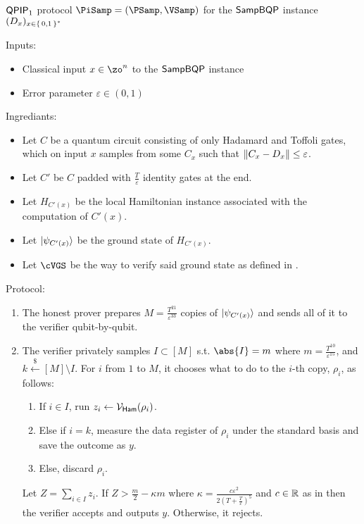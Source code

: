 \begin{protocol}{$\operatorname{\mathsf{QPIP}}_1$ protocol $\PiSamp=(\PSamp, \VSamp)$ for the $\operatorname{\mathsf{SampBQP}}$ instance $(D_x)_{x\in\set{0, 1}^*}$}
	\label{ProtoQPIP1}

	Inputs: 
	\begin{itemize}
		\item Classical input $x\in\zo^n$ to the $\operatorname{\mathsf{SampBQP}}$ instance
		\item Error parameter $\varepsilon\in(0, 1)$
	\end{itemize}

	Ingrediants:
	\begin{itemize}
		\item Let $C$ be a quantum circuit consisting of only Hadamard and Toffoli gates, which on input $x$ samples from some $C_x$ such that $\left\lVert C_x-D_x\right\rVert\leq\varepsilon$.
		\item Let $C'$ be $C$ padded with $\frac{T}{\varepsilon}$ identity gates at the end.
		\item Let $H_{C'(x)}$ be the local Hamiltonian instance associated with the computation of $C'(x)$.
		\item Let $\ket{\psi_{C'(x)}}$ be the ground state of $H_{C'(x)}$.
		\item Let $\cVGS$ be the way to verify said ground state as defined in . 
	\end{itemize}

	Protocol:
	\begin{enumerate}
		\item The honest prover prepares $M=\frac{T^{21}}{\varepsilon^{33}}$ copies of $\ket{\psi_{C'(x)}}$ and sends all of it to the verifier qubit-by-qubit.
		\item The verifier privately samples $I\subset[M]$ s.t. $\abs{I}=m$ where $m=\frac{T^{10}}{\varepsilon^{15}}$, and $k\xleftarrow{\$}[M]\setminus I$.
			For $i$ from $1$ to $M$, it chooses what to do to the $i$-th copy, $\rho_i$, as follows:
		\begin{enumerate}
			\item If $i\in I$, run $z_i\leftarrow\mathcal{V}_{\mathsf{Ham}}(\rho_i)$.
			\item Else if $i=k$, measure the data register  of $\rho_i$ under the standard basis and save the outcome as $y$.
			\item Else, discard $\rho_i$.
		\end{enumerate}
			Let $Z=\sum_{i\in I} z_i$. If $Z>\frac{m}{2}-\kappa m$ where $\kappa=\frac{c\varepsilon^2}{2\left(T+\frac{T}{\varepsilon}\right)^5}$ and $c\in\mathbb{R}$ as in  then the verifier accepts and outputs $y$. Otherwise, it rejects.
	\end{enumerate}
\end{protocol}

